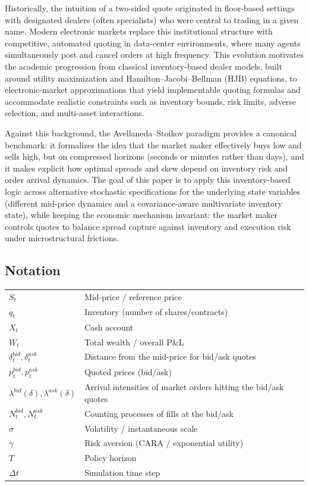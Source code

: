 Historically, the intuition of a two-sided quote originated in floor-based settings with designated dealers (often specialists) who were central to trading in a given name. Modern electronic markets replace this institutional structure with competitive, automated quoting in data-center environments, where many agents simultaneously post and cancel orders at high frequency. This evolution motivates the academic progression from classical inventory-based dealer models, built around utility maximization and Hamilton--Jacobi--Bellman (HJB) equations, to electronic-market approximations that yield implementable quoting formulas and accommodate realistic constraints such as inventory bounds, risk limits, adverse selection, and multi-asset interactions.

Against this background, the Avellaneda--Stoikov paradigm provides a canonical benchmark: it formalizes the idea that the market maker effectively buys low and sells high, but on compressed horizons (seconds or minutes rather than days), and it makes explicit how optimal spreads and skew depend on inventory risk and order arrival dynamics. The goal of this paper is to apply this inventory-based logic across alternative stochastic specifications for the underlying state variables (different mid-price dynamics and a covariance-aware multivariate inventory state), while keeping the economic mechanism invariant: the market maker controls quotes to balance spread capture against inventory and execution risk under microstructural frictions.

\subsection{Notation}
\begin{tabularx}{\textwidth}{@{}lX@{}}
\toprule
$S_t$ & Mid-price / reference price \\
$q_t$ & Inventory (number of shares/contracts) \\
$X_t$ & Cash account \\
$W_t$ & Total wealth / overall P\&L \\
$\delta_t^{bid}, \delta_t^{ask}$ & Distance from the mid-price for bid/ask quotes \\
$p_t^{bid}, p_t^{ask}$ & Quoted prices (bid/ask) \\
$\lambda^{bid}(\delta), \lambda^{ask}(\delta)$ & Arrival intensities of market orders hitting the bid/ask quotes \\
$N_t^{bid}, N_t^{ask}$ & Counting processes of fills at the bid/ask \\
$\sigma$ & Volatility / instantaneous scale \\
$\gamma$ & Risk aversion (CARA / exponential utility) \\
$T$ & Policy horizon \\
$\Delta t$ & Simulation time step \\
\bottomrule
\end{tabularx}

